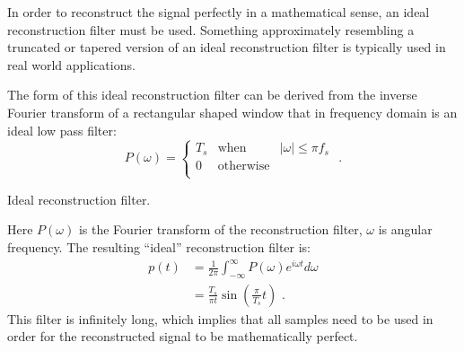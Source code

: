 In order to reconstruct the signal perfectly in a mathematical sense, an ideal 
reconstruction filter must be used.
Something approximately resembling a truncated or tapered version of an ideal reconstruction filter is 
typically used in real world applications.

The form of this ideal reconstruction filter can be derived from the inverse Fourier transform of a 
rectangular shaped window that in frequency domain is an ideal low pass filter:
\begin{equation}
  P(\omega) = \left\{
  \begin{array}{rcr}
    T_s & \mathrm{when}      & |\omega| \le \pi f_s \\
    0   & \mathrm{otherwise} &                      \\
  \end{array}
  \right. \,\,.
\end{equation}
\begin{marginfigure}
  \begin{center}
  \end{center}
  \caption{Ideal reconstruction filter.}
\end{marginfigure}
Here $P(\omega)$ is the Fourier transform of the reconstruction
filter, $\omega$ is angular frequency. The resulting ``ideal''
reconstruction filter is:
\begin{align}
  p(t) & =\frac{1}{2\pi}\int_{-\infty}^{\infty} P(\omega)e^{i\omega t}d\omega \\
       & = \frac{T_s}{\pi t}\sin\left(\frac{\pi}{T_s}t\right)\,\,.
\end{align}
This filter is infinitely long, which implies that all samples need to be used in order for the 
reconstructed signal to be mathematically perfect.

